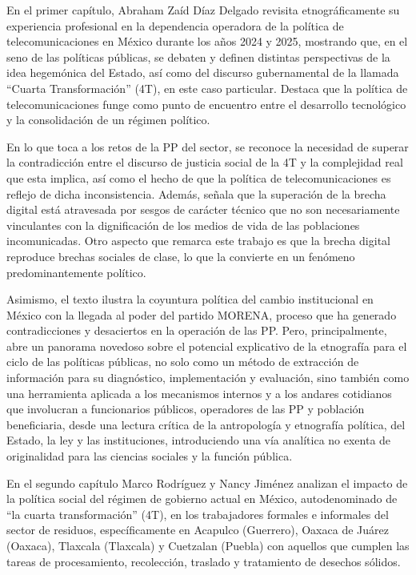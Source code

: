 \documentclass[
  spanish,
  11pt,
  a4paper,
]{scrbook}
\begin{document}
En el primer capítulo, Abraham Zaíd Díaz Delgado revisita
etnográficamente su experiencia profesional en la dependencia operadora
de la política de telecomunicaciones en México durante los años 2024 y
2025, mostrando que, en el seno de las políticas públicas, se debaten y
definen distintas perspectivas de la idea hegemónica del Estado, así
como del discurso gubernamental de la llamada ``Cuarta Transformación''
(4T), en este caso particular. Destaca que la política de
telecomunicaciones funge como punto de encuentro entre el desarrollo
tecnológico y la consolidación de un régimen político.

En lo que toca a los retos de la PP del sector, se reconoce la necesidad
de superar la contradicción entre el discurso de justicia social de la
4T y la complejidad real que esta implica, así como el hecho de que la
política de telecomunicaciones es reflejo de dicha inconsistencia.
Además, señala que la superación de la brecha digital está atravesada
por sesgos de carácter técnico que no son necesariamente vinculantes con
la dignificación de los medios de vida de las poblaciones incomunicadas.
Otro aspecto que remarca este trabajo es que la brecha digital reproduce
brechas sociales de clase, lo que la convierte en un fenómeno
predominantemente político.

Asimismo, el texto ilustra la coyuntura política del cambio
institucional en México con la llegada al poder del partido MORENA,
proceso que ha generado contradicciones y desaciertos en la operación de
las PP. Pero, principalmente, abre un panorama novedoso sobre el
potencial explicativo de la etnografía para el ciclo de las políticas
públicas, no solo como un método de extracción de información para su
diagnóstico, implementación y evaluación, sino también como una
herramienta aplicada a los mecanismos internos y a los andares
cotidianos que involucran a funcionarios públicos, operadores de las PP
y población beneficiaria, desde una lectura crítica de la antropología y
etnografía política, del Estado, la ley y las instituciones,
introduciendo una vía analítica no exenta de originalidad para las
ciencias sociales y la función pública.

\vspace*{.75cm}

En el segundo capítulo Marco Rodríguez y Nancy Jiménez analizan el
impacto de la política social del régimen de gobierno actual en México,
autodenominado de ``la cuarta transformación'' (4T), en los trabajadores
formales e informales del sector de residuos, específicamente en
Acapulco (Guerrero), Oaxaca de Juárez (Oaxaca), Tlaxcala (Tlaxcala) y
Cuetzalan (Puebla) con aquellos que cumplen las tareas de procesamiento,
recolección, traslado y tratamiento de desechos sólidos.
\end{document}
